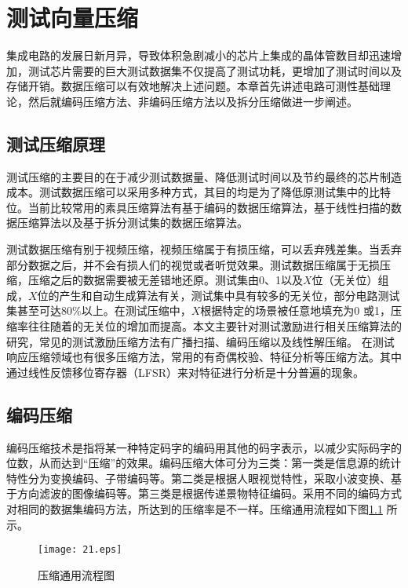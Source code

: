 
\chapter{测试向量压缩}

集成电路的发展日新月异，导致体积急剧减小的芯片上集成的晶体管数目却迅速增加，测试芯片需要的巨大测试数据集不仅提高了测试功耗，更增加了测试时间以及存储开销。数据压缩可以有效地解决上述问题。本章首先讲述电路可测性基础理论，然后就编码压缩方法、非编码压缩方法以及拆分压缩做进一步阐述。

\section{测试压缩原理}

测试压缩的主要目的在于减少测试数据量、降低测试时间以及节约最终的芯片制造成本。测试数据压缩可以采用多种方式，其目的均是为了降低原测试集中的比特位。当前比较常用的素具压缩算法有基于编码的数据压缩算法，基于线性扫描的数据压缩算法以及基于拆分测试集的数据压缩算法。

测试数据压缩有别于视频压缩，视频压缩属于有损压缩，可以丢弃残差集。当丢弃部分数据之后，并不会有损人们的视觉或者听觉效果。测试数据压缩属于无损压缩，压缩之后的数据需要被无差错地还原。测试集由0、1以及$X$位（无关位）组成，$X$位的产生和自动生成算法有关，测试集中具有较多的无关位，部分电路测试集甚至可达80\%以上。在测试压缩中，$X$根据特定的场景被任意地填充为0 或1，压缩率往往随着的无关位的增加而提高。本文主要针对测试激励进行相关压缩算法的研究，常见的测试激励压缩方法有广播扫描、编码压缩以及线性解压缩。 在测试响应压缩领域也有很多压缩方法，常用的有奇偶校验、特征分析等压缩方法。其中通过线性反馈移位寄存器（LFSR）来对特征进行分析是十分普遍的现象\cite{52,53}。

\section{编码压缩}

编码压缩技术是指将某一种特定码字的编码用其他的码字表示，以减少实际码字的位数，从而达到“压缩”的效果。编码压缩大体可分为三类：第一类是信息源的统计特性分为变换编码、子带编码等。第二类是根据人眼视觉特性，采取小波变换、基于方向滤波的图像编码等。第三类是根据传递景物特征编码。采用不同的编码方式对相同的数据集编码方法，所达到的压缩率是不一样。压缩通用流程如下图\ref{25} 所示。

\begin{figure}[H]
  \centering
  \texttt{[image: 21.eps]}
  \caption{压缩通用流程图}\label{25}
     \end{figure}

